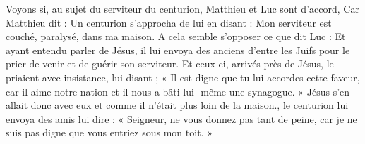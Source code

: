 Voyons si, au sujet du serviteur du centurion, Matthieu et Luc sont d’accord, Car Matthieu dit : Un centurion s'approcha de lui en disant : Mon serviteur est couché, paralysé, dans ma maison. A cela semble s’opposer ce que dit Luc : Et ayant entendu parler de Jésus, il lui envoya des anciens d'entre les Juifs pour le prier de venir et de guérir son serviteur. Et ceux-ci, arrivés près de Jésus, le priaient avec insistance, lui disant ; « Il est digne que tu lui accordes cette faveur, car il aime notre nation et il nous a bâti lui- même une synagogue. » Jésus s'en allait donc avec eux et comme il n'était plus loin de la maison., le centurion lui envoya des amis lui dire : « Seigneur, ne vous donnez pas tant de peine, car je ne suis pas digne que vous entriez sous mon toit. »
